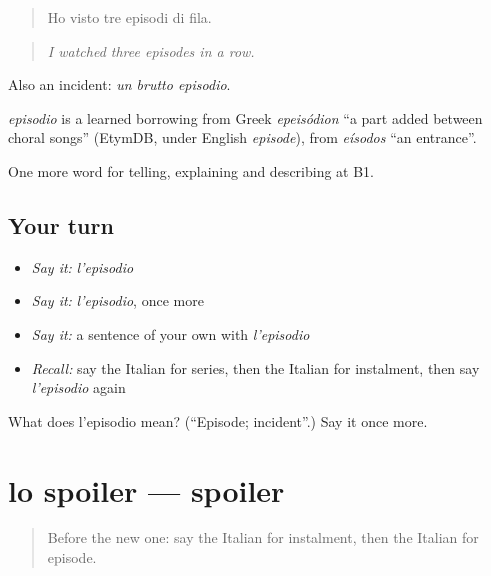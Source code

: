 \begin{quote}
Ho visto tre episodi di fila.
\end{quote}

\begin{quote}
\emph{I watched three episodes in a row.}
\end{quote}

Also an incident: \emph{un brutto episodio}.

\begin{cousinweb}
\emph{episodio} is a learned borrowing from Greek \emph{epeisódion} \textquotedblleft{}a part added between choral songs\textquotedblright{} (EtymDB, under English \emph{episode}), from \emph{eísodos} \textquotedblleft{}an entrance\textquotedblright{}.
\end{cousinweb}

\begin{grammarlens}[title={What you've built}]
One more word for telling, explaining and describing at B1.
\end{grammarlens}

\subsection*{Your turn}
\begin{itemize}
\raggedright
  \item \emph{Say it:} \emph{l'episodio}
  \item \emph{Say it:} \emph{l'episodio}, once more
  \item \emph{Say it:} a sentence of your own with \emph{l'episodio}
  \item \emph{Recall:} say the Italian for series, then the Italian for instalment, then say \emph{l'episodio} again
\end{itemize}

\begin{tcolorbox}[breakable,colback=teal!4,colframe=teal!35!black,title={Before you move on}]
What does l'episodio mean? (\textquotedblleft{}Episode; incident\textquotedblright{}.) Say it once more.
\end{tcolorbox}
\section[lo spoiler]{lo spoiler — spoiler}

\label{lesson:IT-C528-spoiler}



\begin{quote}
Before the new one: say the Italian for instalment, then the Italian for episode.
\end{quote}

